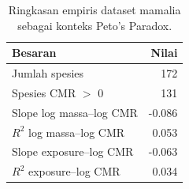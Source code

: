 \begin{table}[t]
\centering
\caption{Ringkasan empiris dataset mamalia sebagai konteks Peto's Paradox.}
\label{tab:empirical-context}
\begin{tabular}{lr}
\toprule
Besaran & Nilai\\
\midrule
Jumlah spesies & 172\\
Spesies CMR $>$ 0 & 131\\
Slope log massa--log CMR & -0.086\\
$R^2$ log massa--log CMR & 0.053\\
Slope exposure--log CMR & -0.063\\
$R^2$ exposure--log CMR & 0.034\\
\bottomrule
\end{tabular}
\end{table}

\newcommand{\SpeciesCount}{172}
\newcommand{\NonzeroSpeciesCount}{131}
\newcommand{\MassSlope}{-0.086}
\newcommand{\MassRsq}{0.053}
\newcommand{\ExposureSlope}{-0.063}
\newcommand{\ExposureRsq}{0.034}
